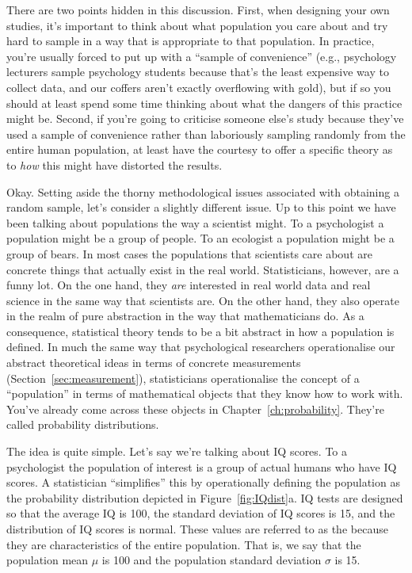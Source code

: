 There are two points hidden in this discussion. First, when designing your own studies, it's important to think about what population you care about and try hard to sample in a way that is appropriate to that population. In practice, you're usually forced to put up with a ``sample of convenience'' (e.g., psychology lecturers sample psychology students because that's the least expensive way to collect data, and our coffers aren't exactly overflowing with gold), but if so you should at least spend some time thinking about what the dangers of this practice might be. Second, if you're going to criticise someone else's study because they've used a sample of convenience rather than laboriously sampling randomly from the entire human population, at least have the courtesy to offer a specific theory as to {\it how} this might have distorted the results. 


Okay. Setting aside the thorny methodological issues associated with obtaining a random sample, let's consider a slightly different issue. Up to this point we have been talking about populations the way a scientist might. To a psychologist a population might be a group of people. To an ecologist a population might be a group of bears. In most cases the populations that scientists care about are concrete things that actually exist in the real world. Statisticians, however, are a funny lot. On the one hand, they {\it are} interested in real world data and real science in the same way that scientists are. On the other hand, they also operate in the realm of pure abstraction in the way that mathematicians do. As a consequence, statistical theory tends to be a bit abstract in how a population is defined. In much the same way that psychological researchers operationalise our abstract theoretical ideas in terms of concrete measurements (Section~\ref{sec:measurement}), statisticians operationalise the concept of a ``population'' in terms of mathematical objects that they know how to work with. You've already come across these objects in Chapter~\ref{ch:probability}. They're called probability distributions.

The idea is quite simple. Let's say we're talking about IQ scores. To a psychologist the population of interest is a group of actual humans who have IQ scores. A statistician ``simplifies'' this by operationally defining the population as the probability distribution depicted in Figure~\ref{fig:IQdist}a. IQ tests are designed so that the average IQ is 100, the standard deviation of IQ scores is 15, and the distribution of IQ scores is normal. These values are referred to as the  because they are characteristics of the entire population. That is, we say that the population mean $\mu$ is 100 and the population standard deviation $\sigma$ is 15.

